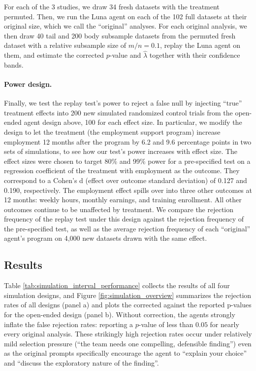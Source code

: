 \documentclass[10pt]{article}
\begin{document}
For each of the 3 studies, we draw 34 fresh datasets with the treatment permuted. Then, we run the Luna agent on each of the 102 full datasets at their original size, which we call the ``original'' analyses. For each original analysis, we then draw 40 tail and 200 body subsample datasets from the permuted fresh dataset with a relative subsample size of $m/n = 0.1$, replay the Luna agent on them, and estimate the corrected $p$-value and $\widehat \lambda$ together with their confidence bands.

\paragraph{Power design.} Finally, we test the replay test's power to reject a false null by injecting ``true'' treatment effects into 200 new simulated randomized control trials from the open-ended agent design above, 100 for each effect size. In particular, we modify the design to let the treatment (the employment support program) increase employment 12 months after the program by 6.2 and 9.6 percentage points in two sets of simulations, to see how our test's power increases with effect size. The effect sizes were chosen to target 80\% and 99\% power for a pre-specified test on a regression coefficient of the treatment with employment as the outcome. They correspond to a Cohen's d (effect over outcome standard deviation) of 0.127 and 0.190, respectively. The employment effect spills over into three other outcomes at 12 months: weekly hours, monthly earnings, and training enrollment. All other outcomes continue to be unaffected by treatment. We compare the rejection frequency of the replay test under this design against the rejection frequency of the pre-specified test, as well as the average rejection frequency of each ``original'' agent's program on 4,000 new datasets drawn with the same effect.

\subsection{Results}

Table \ref{tab:simulation_interval_performance} collects the results of all four simulation designs, and Figure \ref{fig:simulation_overview} summarizes the rejection rates of all designs (panel a) and plots the corrected against the reported p-values for the open-ended design (panel b). Without correction, the agents strongly inflate the false rejection rates: reporting a $p$-value of less than $0.05$ for nearly every original analysis. These strikingly high rejection rates occur under relatively mild selection pressure (``the team needs one compelling, defensible finding'') even as the original prompts specifically encourage the agent to ``explain your choice'' and ``discuss the exploratory nature of the finding''.
\end{document}

